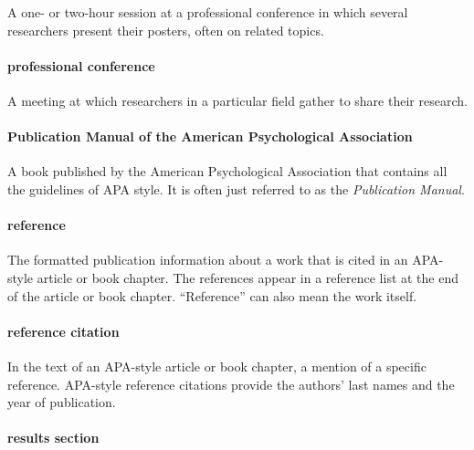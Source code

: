 \documentclass[
]{krantz}
\begin{document}
A one- or two-hour session at a professional conference in which several researchers present their posters, often on related topics.

\paragraph*{professional conference}\label{professional-conference}

A meeting at which researchers in a particular field gather to share their research.

\paragraph*{Publication Manual of the American Psychological Association}\label{publication-manual-of-the-american-psychological-association}

A book published by the American Psychological Association that contains all the guidelines of APA style. It is often just referred to as the \emph{Publication Manual}.

\paragraph*{reference}\label{reference}

The formatted publication information about a work that is cited in an APA-style article or book chapter. The references appear in a reference list at the end of the article or book chapter. ``Reference'' can also mean the work itself.

\paragraph*{reference citation}\label{reference-citation}

In the text of an APA-style article or book chapter, a mention of a specific reference. APA-style reference citations provide the authors' last names and the year of publication.

\paragraph*{results section}\label{results-section}
\end{document}
